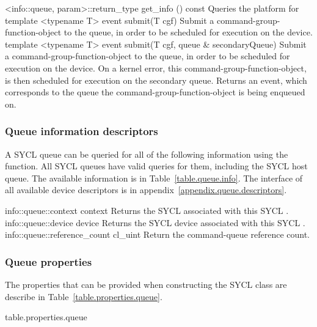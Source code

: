     {  <info::queue, param>::return_type}
    {  get_info ()  const}
    {Queries the platform for }
  \addRowTwoL
    {template <typename T>}
    {event submit(T cgf)}
    {Submit a \gls{command-group-function-object} to the queue, in order to be scheduled
    for execution on the device.}
  \addRowThreeL
    {template <typename T>}
    {event submit(T cgf,}
    {             queue \& secondaryQueue)}
    {Submit a \gls{command-group-function-object} to the queue, in order to be scheduled
    for execution on the device. On a kernel error, this \gls{command-group-function-object},
    is then scheduled for execution on the secondary queue. Returns an
    event, which corresponds to the queue the \gls{command-group-function-object}
    is being enqueued on.}
\completeTable

\subsubsection{Queue information descriptors}

A SYCL \gls{queue} can be queried for all of the following information using the
 function. All SYCL queues have valid queries for them,
including the SYCL host queue. The available information is in
Table~\ref{table.queue.info}. The interface of all available device descriptors is
in appendix~\ref{appendix.queue.descriptors}.

\addInfoRow
{info::queue::context}
{context}
{
  Returns the SYCL  associated with this SYCL .
}
\addInfoRow
{info::queue::device}
{device}
{
  Returns the SYCL \gls{device} associated with this SYCL .
}
\addInfoRow
{info::queue::reference_count}
{cl_uint}
{Return the command-queue reference count.}
\completeTable

\subsubsection{Queue properties}
\label{sec:queue-properties}

The properties that can be provided when constructing the SYCL
 class are describe in
Table~\ref{table.properties.queue}.

 {table.properties.queue}

